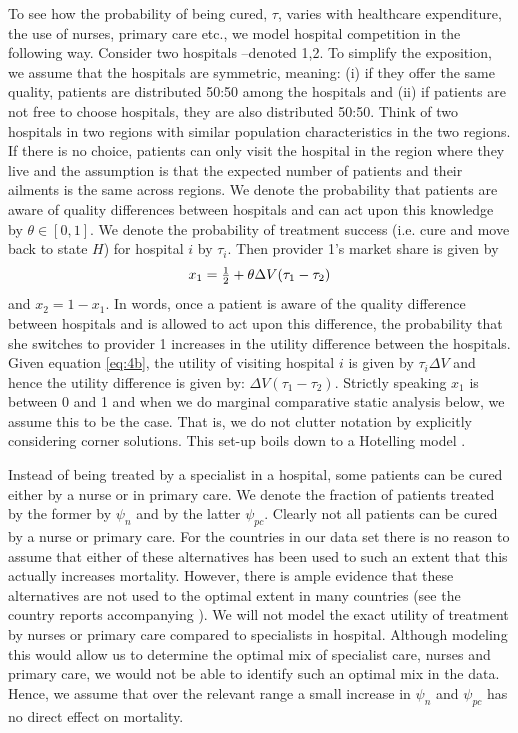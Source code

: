 \documentclass[a4paper,12pt]{article}
\begin{document}
To see how the probability of being cured, \(\tau\), varies with healthcare expenditure, the use of nurses, primary care etc., we model hospital competition in the following way. Consider two hospitals --denoted 1,2. To simplify the exposition, we assume that the hospitals are symmetric, meaning: (i) if they offer the same quality, patients are distributed 50:50 among the hospitals and (ii) if patients are not free to choose hospitals, they are also distributed 50:50. Think of two hospitals in two regions with similar population characteristics in the two regions. If there is no choice, patients can only visit the hospital in the region where they live and the assumption is that the expected number of patients and their ailments is the same across regions. We denote the probability that patients are aware of quality differences between hospitals and can act upon this knowledge by \(\theta \in [0,1]\). We denote the probability of treatment success (i.e. cure and move back to state \(H\)) for hospital \(i\)  by \(\tau_i\). Then provider 1's market share is given by
\begin{equation}
\label{eq:8}
x_1 = \textstyle{1\over 2}  + \theta \Delta V (\tau_1 - \tau_2)
\end{equation}
and \(x_2 = 1- x_1\). In words, once a patient is aware of the quality difference between hospitals and is allowed to act upon this difference, the probability that she switches to provider 1 increases in the utility difference between the hospitals. Given equation \eqref{eq:4b}, the utility of visiting hospital \(i\) is given by \(\tau_i \Delta V\) and hence the utility difference is given by: \(\Delta V (\tau_1-\tau_2)\). Strictly speaking \(x_1\) is between 0 and 1 and when we do marginal comparative static analysis below, we assume this to be the case. That is, we do not clutter notation by explicitly considering corner solutions. This set-up boils down to a Hotelling model \citep{Tirole}.

Instead of being treated by a specialist in a hospital, some patients can be cured either by a nurse or in primary care. We denote the fraction of patients treated by the former by \(\psi_n\) and by the latter \(\psi_{pc}\). Clearly not all patients can be cured by a nurse or primary care. For the countries in our data set there is no reason to assume that either of these alternatives has been used to such an extent that this actually increases mortality. However, there is ample evidence that these alternatives are not used to the optimal extent in many countries (see the country reports accompanying \cite{countryprofileReport}). We will not model the exact utility of treatment by nurses or primary care compared to specialists in hospital. Although modeling this would allow us to determine the optimal mix of specialist care, nurses and primary care, we would not be able to identify such an optimal mix in the data. Hence, we assume that over the relevant range a small increase in \(\psi_n\) and \(\psi_{pc}\) has no direct effect on mortality.
\end{document}
